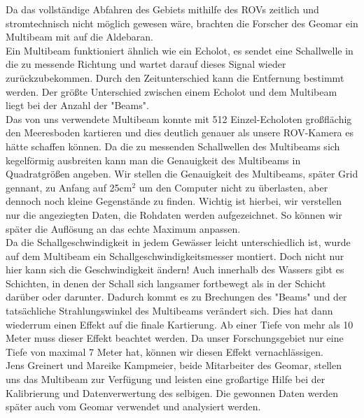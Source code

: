  

Da das vollständige Abfahren des Gebiets mithilfe des ROVs zeitlich und stromtechnisch nicht 
möglich gewesen wäre, brachten die Forscher des Geomar ein Multibeam mit auf die Aldebaran. \\

Ein Multibeam funktioniert ähnlich wie ein Echolot, es sendet eine Schallwelle in die zu messende 
Richtung und wartet darauf dieses Signal wieder zurückzubekommen. Durch den Zeitunterschied 
kann die Entfernung bestimmt werden. Der größte Unterschied zwischen einem Echolot und dem Multibeam 
liegt bei der Anzahl der "Beams". \\

Das von uns verwendete Multibeam konnte mit 512 Einzel-Echoloten großflächig den Meeresboden kartieren und dies 
deutlich genauer als unsere ROV-Kamera es hätte schaffen können. Da die zu messenden Schallwellen des Multibeams 
sich kegelförmig ausbreiten kann man die Genauigkeit des Multibeams in Quadratgrößen angeben. 
Wir stellen die Genauigkeit des Multibeams, später Grid gennant, zu Anfang auf 25cm$^2$ um den Computer nicht zu überlasten, aber 
dennoch noch kleine Gegenstände zu finden. Wichtig ist hierbei, wir verstellen nur die angeziegten Daten, die Rohdaten werden aufgezeichnet. 
So können wir später die Auflösung an das echte Maximum anpassen.\\

Da die Schallgeschwindigkeit in jedem Gewässer leicht unterschiedlich ist, wurde auf dem Multibeam
ein Schallgeschwindigkeitsmesser montiert. Doch nicht nur hier kann sich die Geschwindigkeit ändern!
Auch innerhalb des Wassers gibt es Schichten, in denen der Schall sich langsamer fortbewegt als in
der Schicht darüber oder darunter. Dadurch kommt es zu Brechungen des "Beams" und der tatsächliche 
Strahlungswinkel des Multibeams verändert sich. Dies hat dann wiederrum einen Effekt auf die finale Kartierung.
Ab einer Tiefe von mehr als 10 Meter muss dieser Effekt beachtet werden. Da unser Forschungsgebiet nur eine 
Tiefe von maximal 7 Meter hat, können wir diesen Effekt vernachlässigen.\\

Jens Greinert und Mareike Kampmeier, beide Mitarbeiter des Geomar, stellen uns das Multibeam zur Verfügung und 
leisten eine großartige Hilfe bei der Kalibrierung und Datenverwertung des selbigen. Die gewonnen Daten werden 
später auch vom Geomar verwendet und analysiert werden. \\

